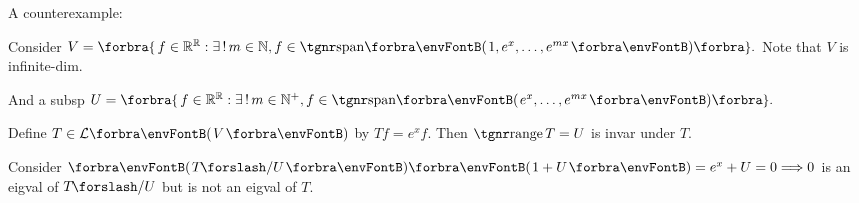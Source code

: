 \documentclass[a4paper, 11pt, UTF8]{article}
\begin{document}
\begin{large}
A counterexample:\par\quad
Consider $V=\Bra{\,f\in\Rbb^{\Rbb}:\exists\,!\,m\in\Nbb,f\in\Span{1,e^x,\dots,e^{mx}}}.$ Note that $V$ is infinite-dim.\par\quad
And a subsp $U=\Bra{\,f\in\Rbb^{\Rbb}:\exists\,!\,m\in\Nbp,f\in\Span{e^x,\dots,e^{mx}}}.$\par\quad
Define $T\in\Lm{V}$ by $Tf=e^x f.$ Then $\range T=U$ is invar under $T.$\par\quad
Consider $\Par{T\mySlash U}\Par{1+U}=e^x+U=0\Longrightarrow 0$ is an eigval of $T\mySlash U$ but is not an eigval of $T$.\par\quad
{}\PfEnd
\SepLine


\end{large}
\end{document}
